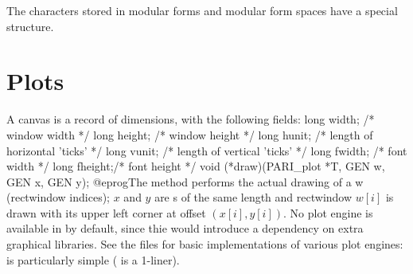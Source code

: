  The characters stored in modular forms and modular form
spaces have a special structure.























\newpage

\chapter{Plots}

A  canvas is a record of dimensions, with the following fields:
\bprog
  long width;  /* window width */
  long height; /* window height */
  long hunit;  /* length of horizontal 'ticks' */
  long vunit;  /* length of vertical 'ticks' */
  long fwidth; /* font width */
  long fheight;/* font height */
  void (*draw)(PARI_plot *T, GEN w, GEN x, GEN y);
@eprog\noindent The  method performs the actual drawing of
a  w (rectwindow indices); $x$ and $y$ are s
of the same length and rectwindow $w[i]$ is drawn with its upper left
corner at offset $(x[i],y[i])$. No plot engine is available in 
by default, since thie would introduce a dependency on extra graphical
libraries. See the files  for basic implementations of
various plot engines:  is particularly simple ( is a
1-liner).

